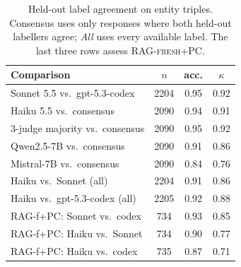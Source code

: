 \begin{table}[t]\centering\small\setlength\tabcolsep{4pt}
\begin{tabular}{@{}l ccc@{}}
\toprule
Comparison & $n$ & acc. & $\kappa$ \\
\midrule
Sonnet 5.5 vs.\ gpt-5.3-codex & 2204 & 0.95 & 0.92 \\
\midrule
Haiku 5.5 vs.\ consensus & 2090 & 0.94 & 0.91 \\
3-judge majority vs.\ consensus & 2090 & 0.95 & 0.92 \\
Qwen2.5-7B vs.\ consensus & 2090 & 0.91 & 0.86 \\
Mistral-7B vs.\ consensus & 2090 & 0.84 & 0.76 \\
\midrule
Haiku vs.\ Sonnet (all) & 2204 & 0.91 & 0.86 \\
Haiku vs.\ gpt-5.3-codex (all) & 2205 & 0.92 & 0.88 \\
RAG-f+PC: Sonnet vs.\ codex & \hphantom{0}734 & 0.93 & 0.85 \\
RAG-f+PC: Haiku vs.\ Sonnet & \hphantom{0}734 & 0.90 & 0.77 \\
RAG-f+PC: Haiku vs.\ codex & \hphantom{0}735 & 0.87 & 0.71 \\
\bottomrule\end{tabular}
\caption{Held-out label agreement on entity triples. Consensus uses only responses where both held-out labellers agree; \emph{All} uses every available label. The last three rows assess \textsc{RAG-fresh+PC}.}
\label{tab:heldout}\end{table}
